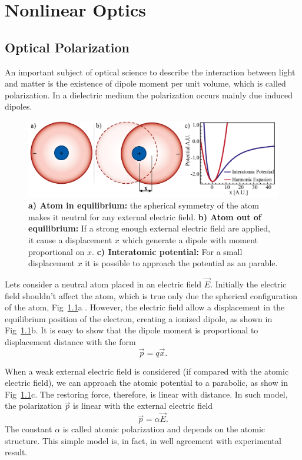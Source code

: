 \chapter{Nonlinear Optics}
\section{Optical Polarization}
An important subject of optical science to describe the interaction between light and matter is the existence of dipole moment per unit volume, which is called polarization. In a dielectric medium the polarization occurs mainly due induced dipoles.

\begin{figure}[h!]
    \centering
    \includegraphics[width = 16cm]{figuras/Dissertation_atomic_polarization.jpg}
    \caption{\textbf{a) Atom in equilibrium:} the spherical symmetry of the atom makes it neutral for any external electric field. \textbf{b) Atom out of equilibrium:} If a strong enough external electric field are applied, it cause a displacement $x$ which generate a dipole with moment proportional on $x$. \textbf{c) Interatomic potential:} For a small displacement $x$ it is possible to approach the potential as an parable.}
    \label{fig:polarization}
\end{figure}
Lets consider a neutral atom placed in an electric field $\vec{E}$. Initially the electric field shouldn't affect the atom, %
which is true only due the spherical configuration of the atom, Fig~\ref{fig:polarization}a
. However, the electric field allow a displacement in the equilibrium position of the electron, creating a ionized dipole, as shown in Fig~\ref{fig:polarization}b. It is easy to show that the dipole moment is proportional to displacement distance with the form
\begin{equation}
    \vec{p} = q\vec{x}.
\end{equation}

When a weak external electric field is considered (if compared with the atomic electric field), we can approach the atomic potential to a parabolic, as show in Fig~\ref{fig:polarization}c. The restoring force, therefore, is linear with distance. In such model, the polarization $\vec{p}$ is linear with the external electric field
\begin{equation}
    \vec{p} = \alpha \vec{E}.
\end{equation}
The constant $\alpha$ is called atomic polarization and depends on the atomic structure. This simple model is, in fact, in well agreement with experimental result.  


